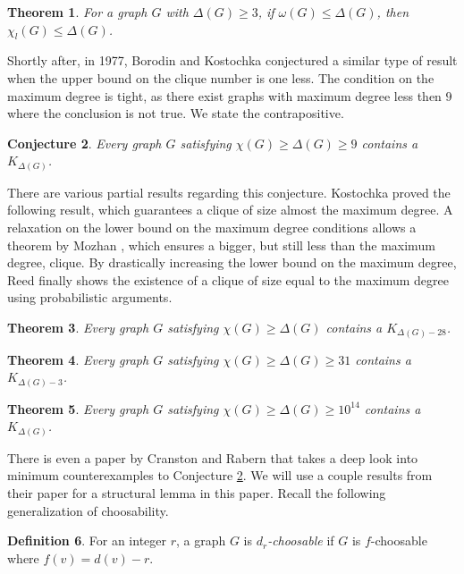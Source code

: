 \documentclass[12pt]{article}
\newtheorem{theorem}{Theorem}[section]
\newtheorem{conjecture}[theorem]{Conjecture}
\theoremstyle{definition}
\newtheorem{definition}[theorem]{Definition}
\begin{document}
\begin{theorem}\cite{Br41}
For a graph $G$ with $\Delta(G)\geq 3$, if $\omega(G)\leq \Delta(G)$, then $\chi_l(G)\leq \Delta(G)$. 
\end{theorem}

Shortly after, in 1977, Borodin and Kostochka \cite{BK77} conjectured a similar type of result when the upper bound on the clique number is one less. 
The condition on the maximum degree is tight, as there exist graphs with maximum degree less then $9$ where the conclusion is not true. We state the contrapositive.

\begin{conjecture}\cite{BK77}\label{BKconj}
Every graph $G$ satisfying $\chi(G)\geq \Delta(G)\geq 9$ contains a $K_{\Delta(G)}$. 
\end{conjecture}

There are various partial results regarding this conjecture. 
Kostochka \cite{Ko80} proved the following result, which guarantees a clique of size almost the maximum degree. 
A relaxation on the lower bound on the maximum degree conditions allows a theorem by Mozhan \cite{Mo83}, which ensures a bigger, but still less than the maximum degree, clique. 
By drastically increasing the lower bound on the maximum degree, Reed \cite{Re99} finally shows the existence of a clique of size equal to the maximum degree using probabilistic arguments. 

\begin{theorem}\cite{Ko80}
Every graph $G$ satisfying $\chi(G)\geq \Delta(G)$ contains a $K_{\Delta(G)-28}$. 
\end{theorem}

\begin{theorem}\cite{Mo83}
Every graph $G$ satisfying $\chi(G)\geq \Delta(G)\geq 31$ contains a $K_{\Delta(G)-3}$. 
\end{theorem}

\begin{theorem}\cite{Re99}
Every graph $G$ satisfying $\chi(G)\geq \Delta(G)\geq 10^{14}$ contains a $K_{\Delta(G)}$.
\end{theorem}

There is even a paper by Cranston and Rabern \cite{CR12} that takes a deep look into minimum counterexamples to Conjecture \ref{BKconj}.
We will use a couple results from their paper for a structural lemma in this paper. 
Recall the following generalization of choosability. 

\begin{definition}
For an integer $r$, a graph $G$ is {\it $d_r$-choosable} if $G$ is $f$-choosable where $f(v)=d(v)-r$. 
\end{definition}
\end{document}
